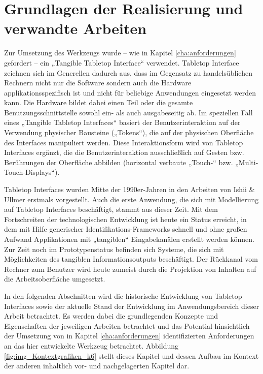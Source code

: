 
\chapter{Grundlagen der Realisierung und verwandte Arbeiten} %
\label{cha:implementierung_Überblick}

Zur Umsetzung des Werkzeugs wurde -- wie in Kapitel \ref{cha:anforderungen} gefordert -- ein „Tangible Tabletop Interface“ verwendet. Tabletop Interface zeichnen sich im Generellen dadurch aus, dass im Gegensatz zu handelsüblichen Rechnern nicht nur die Software sondern auch die Hardware applikationsspezifisch ist und nicht für beliebige Anwendungen eingesetzt werden kann. Die Hardware bildet dabei einen Teil oder die gesamte Benutzungsschnittstelle sowohl ein- als auch ausgabeseitig ab. Im speziellen Fall eines „Tangible Tabletop Interfaces“ basiert der Benutzerinteraktion auf der Verwendung physischer Bausteine („Tokens“), die auf der physischen Oberfläche des Interfaces manipuliert werden. Diese Interaktionsform wird von Tabletop Interfaces ergänzt, die die Benutzerinteraktion ausschließlich auf Gesten bzw. Berührungen der Oberfläche abbilden (horizontal verbaute „Touch-“ bzw. „Multi-Touch-Displays“).

Tabletop Interfaces wurden Mitte der 1990er-Jahren in den Arbeiten von Ishii \& Ullmer erstmals vorgestellt. Auch die erste Anwendung, die sich mit Modellierung auf Tabletop Interfaces beschäftigt, stammt aus dieser Zeit. Mit dem Fortschreiten der technologischen Entwicklung ist heute ein Status erreicht, in dem mit Hilfe generischer Identifikations-Frameworks schnell und ohne großen Aufwand Applikationen mit „tangiblen“ Eingabekanälen erstellt werden können. Zur Zeit noch im Prototypenstatus befinden sich Systeme, die sich mit Möglichkeiten des tangiblen Informationsoutputs beschäftigt. Der Rückkanal vom Rechner zum Benutzer wird heute zumeist durch die Projektion von Inhalten auf die Arbeitsoberfläche umgesetzt.

In den folgenden Abschnitten wird die historische Entwicklung von Tabletop Interfaces sowie der aktuelle Stand der Entwicklung im Anwendungsbereich dieser Arbeit betrachtet. Es werden dabei die grundlegenden Konzepte und Eigenschaften der jeweiligen Arbeiten betrachtet und das Potential hinsichtlich der Umsetzung von in Kapitel \ref{cha:anforderungen} identifizierten Anforderungen an das hier entwickelte Werkzeug betrachtet. Abbildung \ref{fig:img_Kontextgrafiken_k6} stellt dieses Kapitel und dessen Aufbau im Kontext der anderen inhaltlich vor- und nachgelagerten Kapitel dar.

